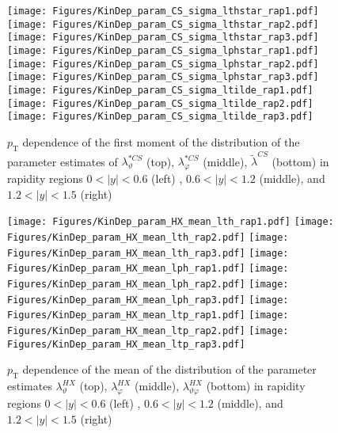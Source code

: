 \documentclass[12pt]{article}
\newcommand{\pT}{p_\mathrm{T}}
\newcommand{\absy}{\left |  y \right |}
\newcommand{\lamtildeCS}{\tilde{\lambda}^{\scriptscriptstyle CS}}
\newcommand{\lamthstarCS}{\lambda^{* \scriptscriptstyle CS}_\vartheta}
\newcommand{\lamphstarCS}{\lambda^{* \scriptscriptstyle CS}_\varphi}
\newcommand{\lamthHX}{\lambda^{\scriptscriptstyle HX}_\vartheta}
\newcommand{\lamphHX}{\lambda^{\scriptscriptstyle HX}_\varphi}
\newcommand{\lamthphHX}{\lambda^{\scriptscriptstyle HX}_{\vartheta \varphi}}
\begin{document}
\begin{figure}[htbp]
\centering
\texttt{[image: Figures/KinDep\_param\_CS\_sigma\_lthstar\_rap1.pdf]}
\texttt{[image: Figures/KinDep\_param\_CS\_sigma\_lthstar\_rap2.pdf]}
\texttt{[image: Figures/KinDep\_param\_CS\_sigma\_lthstar\_rap3.pdf]}
\texttt{[image: Figures/KinDep\_param\_CS\_sigma\_lphstar\_rap1.pdf]}
\texttt{[image: Figures/KinDep\_param\_CS\_sigma\_lphstar\_rap2.pdf]}
\texttt{[image: Figures/KinDep\_param\_CS\_sigma\_lphstar\_rap3.pdf]}
\texttt{[image: Figures/KinDep\_param\_CS\_sigma\_ltilde\_rap1.pdf]}
\texttt{[image: Figures/KinDep\_param\_CS\_sigma\_ltilde\_rap2.pdf]}
\texttt{[image: Figures/KinDep\_param\_CS\_sigma\_ltilde\_rap3.pdf]}
\caption{$\pT$ dependence of the first moment of the distribution of the parameter estimates of $\lamthstarCS$ (top), $\lamphstarCS$ (middle), $\lamtildeCS$ (bottom) in rapidity regions $0<\absy<0.6$ (left) , $0.6<\absy<1.2$ (middle), and $1.2<\absy<1.5$ (right)}
\end{figure}
\clearpage









\begin{figure}[htbp]
\centering
\texttt{[image: Figures/KinDep\_param\_HX\_mean\_lth\_rap1.pdf]}
\texttt{[image: Figures/KinDep\_param\_HX\_mean\_lth\_rap2.pdf]}
\texttt{[image: Figures/KinDep\_param\_HX\_mean\_lth\_rap3.pdf]}
\texttt{[image: Figures/KinDep\_param\_HX\_mean\_lph\_rap1.pdf]}
\texttt{[image: Figures/KinDep\_param\_HX\_mean\_lph\_rap2.pdf]}
\texttt{[image: Figures/KinDep\_param\_HX\_mean\_lph\_rap3.pdf]}
\texttt{[image: Figures/KinDep\_param\_HX\_mean\_ltp\_rap1.pdf]}
\texttt{[image: Figures/KinDep\_param\_HX\_mean\_ltp\_rap2.pdf]}
\texttt{[image: Figures/KinDep\_param\_HX\_mean\_ltp\_rap3.pdf]}
\caption{$\pT$ dependence of the mean of the distribution of the parameter estimates $\lamthHX$ (top), $\lamphHX$ (middle), $\lamthphHX$ (bottom) in rapidity regions $0<\absy<0.6$ (left) , $0.6<\absy<1.2$ (middle), and $1.2<\absy<1.5$ (right)}
\end{figure}
\clearpage
\end{document}
